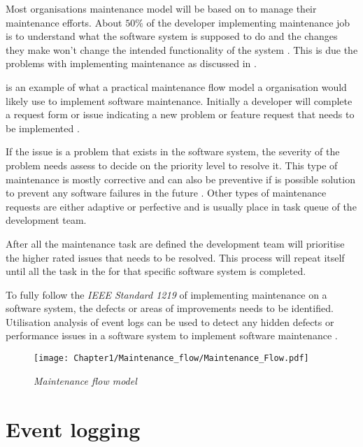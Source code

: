 Most organisations maintenance model will be based on  to manage their maintenance efforts. About $50\%$ of the developer implementing maintenance job is to understand what the software system is supposed to do and the changes they make won't change the intended functionality of the system \cite{Tang2010,Zhuo}. This is due the problems with implementing maintenance as discussed in .\par {} is an example of what a practical maintenance flow model a organisation would likely use to implement software maintenance. Initially a developer will complete a request form or issue indicating a new problem or feature request that needs to be implemented \cite{Tang2010}.\par If the issue is a problem that exists in the software system, the severity of the problem needs assess to decide on the priority level to resolve it. This type of maintenance is mostly corrective and can also be preventive if is possible solution to prevent any software failures in the future \cite{Tang2010}. Other types of maintenance requests are either adaptive or perfective and is usually place in task queue of the development team.\par After  all the maintenance task are defined the development team will prioritise the higher rated issues that needs to be resolved. This process will repeat itself until all the task in the for that specific software system is completed.\par To fully follow the \textit{IEEE Standard 1219} of implementing maintenance on a software system, the defects or areas of improvements needs to be identified. Utilisation analysis of event logs can be used to detect any hidden defects or performance issues in a software system to implement software maintenance \cite{Cinque2013, Rong2018a, Levin2019}.

\begin{figure}[!htb] %
	\centering %
	\texttt{[image: Chapter1/Maintenance\_flow/Maintenance\_Flow.pdf]}
	\caption[Maintenance flow model]
	{\textit{Maintenance flow model \cite{Tang2010}}} \label{fig:CH1_MaintenanceFlow}
\end{figure}

\clearpage

\section{Event logging}\label{sec:EventLogging}

